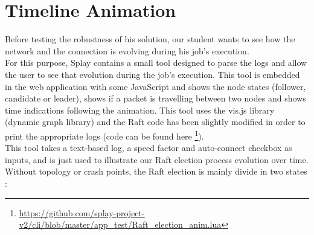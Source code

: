 \documentclass{eplmastersthesis}
\begin{document}
      \section{Timeline Animation}

        Before testing the robustness of his solution, our student wants to
        see how the network and the connection is evolving during his job's
        execution.\\
        For this purpose, Splay contains a small tool designed to parse the
        logs and allow the user to see that evolution during the job's
        execution. This tool is embedded in the web application with some
        JavaScript and shows the node states (follower, candidate or leader),
        shows if a packet is travelling between two nodes and shows time
        indications following the animation. This tool uses the vis.js library
        \cite{VisJS} (dynamic graph library) and the Raft code has been slightly
        modified in order to print the appropriate logs (code can be found here
        \footnote{\url{https://github.com/splay-project-v2/cli/blob/master/app_test/Raft_election_anim.lua}}).\\

        This tool takes a text-based log, a speed factor and auto-connect
        checkbox as inputs, and is just used to illustrate our Raft election
        process evolution over time. Without topology or crash points, the
        Raft election is mainly divide in two states :
\end{document}
